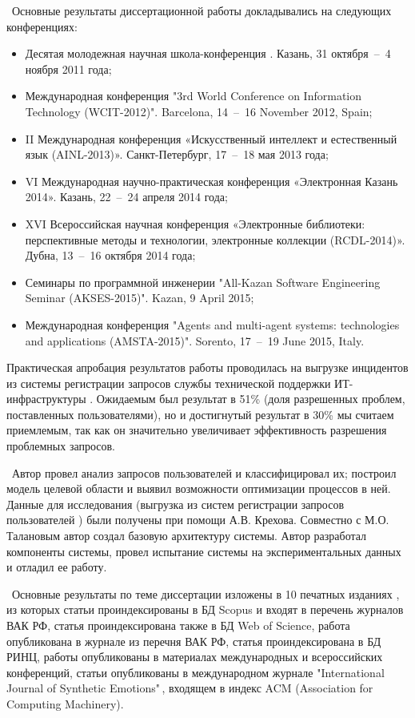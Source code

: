 \probation\
 Основные результаты диссертационной работы докладывались на следующих конференциях:
\begin{itemize}
	\item Десятая молодежная научная школа-конференция . Казань, 31 октября~--~4 ноября 2011 года;
	\item Международная конференция "3rd World Conference on Information Technology (WCIT-2012)". Barcelona, 14~--~16 November 2012, Spain; 
	\item II Международная конференция «Искусственный интеллект и естественный язык (AINL-2013)». Санкт-Петербург, 17~--~18 мая 2013 года;
	\item VI Международная научно-практическая конференция «Электронная Казань 2014». Казань, 22~--~24 апреля 2014 года;
	\item XVI Всероссийская научная конференция «Электронные библиотеки: перспективные методы и технологии, электронные коллекции (RCDL-2014)». Дубна, 13~--~16 октября 2014 года; 
	\item Семинары по программной инженерии "All-Kazan Software Engineering Seminar (AKSES-2015)". Kazan, 9 April 2015;
	\item Международная конференция "Agents and multi-agent systems: technologies and applications (AMSTA-2015)". Sorento, 17~--~19 June 2015, Italy.
\end{itemize} \par
Практическая апробация результатов работы проводилась на выгрузке инцидентов из системы регистрации запросов службы технической поддержки ИТ-инфраструктуры \icl. Ожидаемым был результат в 51\% (доля разрешенных проблем, поставленных пользователями), но и достигнутый результат в 30\% мы считаем приемлемым, так как он значительно увеличивает эффективность разрешения проблемных запросов. \par
\contribution\ Автор провел анализ запросов пользователей и классифицировал их; построил модель целевой области и выявил возможности оптимизации процессов в ней. Данные для исследования (выгрузка из систем регистрации запросов пользователей \iclshort) были получены при помощи А.В. Крехова.  Совместно с М.О. Талановым автор создал базовую архитектуру системы. Автор разработал компоненты системы, провел испытание системы на экспериментальных данных и отладил ее работу. \par
\publications\ Основные результаты по теме диссертации изложены в 10 печатных изданиях  \cite{Lobachevskii, WCIT-2012,  ISGZ, IJSE-1, IJSE-2, RCDL-2014, AMSTA-2015, VAK-1, EB-1, EB-2}, из которых статьи \cite{RCDL-2014, AMSTA-2015} проиндексированы в БД Scopus и входят в перечень журналов ВАК РФ, статья \cite{AMSTA-2015} проиндексирована также в БД Web of Science, работа \cite{VAK-1} опубликована в журнале из перечня ВАК РФ, статья \cite{ISGZ} проиндексирована в БД РИНЦ, работы \cite{Lobachevskii, WCIT-2012, ISGZ} опубликованы в материалах международных и всероссийских конференций, статьи \cite{IJSE-1, IJSE-2} опубликованы в международном журнале "International Journal of Synthetic Emotions"\,, входящем в индекс ACM (Association for Computing Machinery). \par
